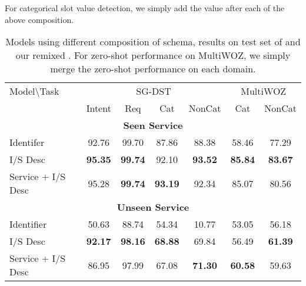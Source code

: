 For categorical slot value detection, we simply add the
value after each of the above composition.

\begin{table}[!t]
  \caption{\label{tbl:schema-component-results} Models using different
    composition of schema, results on test set of \sgdst and our
    remixed \multiwoz. For zero-shot performance on MultiWOZ, we
    simply merge the zero-shot performance on each domain.}
\begin{center}
\setlength{\tabcolsep}{3pt}
\begin{tabular}{l|cccc|cc}
\toprule
\hline
Model\textbackslash{Task} & \multicolumn{4}{c|}{SG-DST} & \multicolumn{2}{c}{MultiWOZ}                                        \\
                          & Intent                      & Req         & Cat         & NonCat      & Cat         & NonCat      \\ \hline
  \multicolumn{7}{c}{{\bf Seen Service}}                                                                                      \\ \hline
Identifer                 & 92.76                       & 99.70       & 87.86       & 88.38       & 58.46       & 77.29       \\
I/S Desc                  & {\bf 95.35}                 & {\bf 99.74} & 92.10       & {\bf 93.52} & {\bf 85.84} & {\bf 83.67} \\
Service + I/S Desc        & 95.28                       & {\bf 99.74} & {\bf 93.19} & 92.34       & 85.07       & 80.56       \\ \hline
  \multicolumn{7}{c}{{\bf Unseen Service}}                                                                                    \\ \hline
Identifier                & 50.63                       & 88.74       & 54.34       & 10.77       & 53.05       & 56.18       \\
I/S Desc                  & {\bf 92.17}                 & {\bf 98.16} & {\bf 68.88} & 69.84       & 56.49       & {\bf 61.39} \\
Service + I/S Desc        & 86.95                       & 97.99       & 67.08       & {\bf 71.30} & {\bf 60.58} & 59.63       \\
\hline
\bottomrule
\end{tabular}
\end{center}
\end{table}
